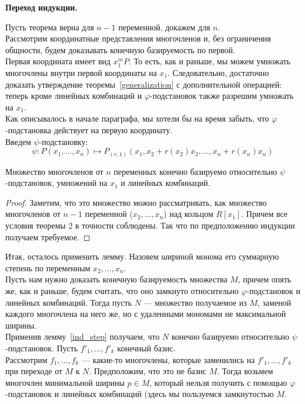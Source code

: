 \vskip 0.1in\noindent
{\large\textbf{Переход индукции.}}

Пусть теорема верна для $n-1$ переменной, докажем для $n$.\\
Рассмотрим координатные представления многочленов и, без ограничения общности, будем доказывать конечную базируемость по первой.\\
Первая координата имеет вид $x_1^m P$.
То есть, как и раньше, мы можем умножать многочлены внутри первой координаты на $x_1$.
Следовательно, достаточно доказать утверждение теоремы~\ref{generalization} с дополнительной операцией: теперь кроме линейных комбинаций и $\varphi$-подстановок также разрешим умножать на $x_1$.\\
Как описывалось в начале параграфа, мы хотели бы на время забыть, что $\varphi$-подстановка действует на первую координату. \\Введем $\psi$-подстановку:
\[\psi : P(x_1,\ldots,x_n) \mapsto P_{(r,1)}(x_1,x_2+r(x_2)x_2,\ldots,x_n+r(x_n)x_n)\]\vskip 0.1in\noindent
\begin{lemma}
    \label{ind_step}
    Множество многочленов от $n$ переменных конечно базируемо относительно $\psi$-подстановок, умножений на $x_1$ и линейных комбинаций.
\end{lemma}
\begin{proof}
    Заметим, что это множество можно рассматривать, как множество многочленов от $n-1$ переменной ($x_2,\ldots,x_n$) над кольцом $R[x_1]$.
    Причем все условия теоремы 2 в точности соблюдены.
    Так что по предположению индукции получаем требуемое.
\end{proof}
Итак, осталось применить лемму.
Назовем {\textit шириной} монома его суммарную степень по переменным $x_2,\ldots,x_n$.\\
Пусть нам нужно доказать конечную базируемость множества $M$, причем опять же, как и раньше, будем считать, что оно замкнуто относительно $\varphi$-подстановок и линейных комбинаций.
Тогда пусть $N$ --- множество получаемое из $M$, заменой каждого многочлена на него же, но с удаленными мономами не максимальной ширины.\\
Применив лемму~\ref{ind_step} получаем, что $N$ конечно базируемо относительно $\psi$-подстановок.
Пусть $f'_1,\ldots,f'_k$ конечный базис.\\
Рассмотрим $f_1,\ldots,f_k$ --- какие-то многочлены, которые заменились на $f'_1,\ldots,f'_k$ при переходе от $M$ к $N$.
Предположим, что это не базис $M$.
Тогда возьмем многочлен минимальной ширины $p\in M$, который нельзя получить с помощью $\varphi$-подстановок и линейных комбинаций (здесь мы пользуемся замкнутостью $M$.
